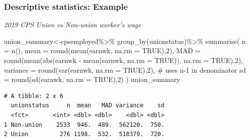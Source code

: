 \documentclass[
  letterpaper,
  DIV=11,
  numbers=noendperiod]{scrartcl}
\newenvironment{Shaded}{\begin{snugshade}}{\end{snugshade}}
\newcommand{\AttributeTok}[1]{\textcolor[rgb]{0.40,0.45,0.13}{#1}}
\newcommand{\CommentTok}[1]{\textcolor[rgb]{0.37,0.37,0.37}{#1}}
\newcommand{\ConstantTok}[1]{\textcolor[rgb]{0.56,0.35,0.01}{#1}}
\newcommand{\DecValTok}[1]{\textcolor[rgb]{0.68,0.00,0.00}{#1}}
\newcommand{\FunctionTok}[1]{\textcolor[rgb]{0.28,0.35,0.67}{#1}}
\newcommand{\NormalTok}[1]{\textcolor[rgb]{0.00,0.23,0.31}{#1}}
\newcommand{\OtherTok}[1]{\textcolor[rgb]{0.00,0.23,0.31}{#1}}
\newcommand{\SpecialCharTok}[1]{\textcolor[rgb]{0.37,0.37,0.37}{#1}}
\begin{document}
\subsubsection{Descriptive statistics:
Example}\label{descriptive-statistics-example}

\emph{2019 CPS Union vs Non-union worker's wage}

\begin{Shaded}
\begin{Highlighting}[]
\NormalTok{union\_summary}\OtherTok{\textless{}{-}}\NormalTok{cpsemployed}\SpecialCharTok{\%\textgreater{}\%}
  \FunctionTok{group\_by}\NormalTok{(unionstatus)}\SpecialCharTok{\%\textgreater{}\%}
  \FunctionTok{summarise}\NormalTok{(}
    \AttributeTok{n =} \FunctionTok{n}\NormalTok{(),}
    \AttributeTok{mean =} \FunctionTok{round}\NormalTok{(}\FunctionTok{mean}\NormalTok{(earnwk, }\AttributeTok{na.rm =} \ConstantTok{TRUE}\NormalTok{),}\DecValTok{2}\NormalTok{),}
    \AttributeTok{MAD =} \FunctionTok{round}\NormalTok{(}\FunctionTok{mean}\NormalTok{(}\FunctionTok{abs}\NormalTok{(earnwk }\SpecialCharTok{{-}} \FunctionTok{mean}\NormalTok{(earnwk, }\AttributeTok{na.rm =} \ConstantTok{TRUE}\NormalTok{)), }\AttributeTok{na.rm =} \ConstantTok{TRUE}\NormalTok{),}\DecValTok{2}\NormalTok{),}
    \AttributeTok{variance =} \FunctionTok{round}\NormalTok{(}\FunctionTok{var}\NormalTok{(earnwk, }\AttributeTok{na.rm =} \ConstantTok{TRUE}\NormalTok{),}\DecValTok{2}\NormalTok{),   }\CommentTok{\# uses n{-}1 in denominator}
    \AttributeTok{sd =} \FunctionTok{round}\NormalTok{(}\FunctionTok{sd}\NormalTok{(earnwk, }\AttributeTok{na.rm =} \ConstantTok{TRUE}\NormalTok{),}\DecValTok{2}\NormalTok{)}
\NormalTok{  )}
\NormalTok{union\_summary}
\end{Highlighting}
\end{Shaded}

\begin{verbatim}
# A tibble: 2 x 6
  unionstatus     n  mean   MAD variance    sd
  <fct>       <int> <dbl> <dbl>    <dbl> <dbl>
1 Non-union    2533  946.  489.  562120.  750.
2 Union         276 1198.  532.  518379.  720.
\end{verbatim}
\end{document}
